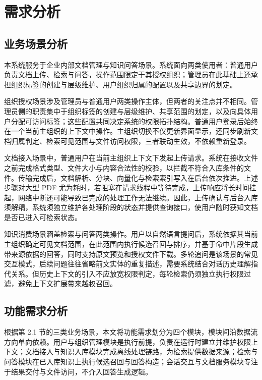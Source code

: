 \chapter{需求分析}
\label{cha:requirement}
\label{cha:requirements}

\section{业务场景分析}
\label{sec:business_scenario}

本系统服务于企业内部文档管理与知识问答场景。系统面向两类使用者：普通用户负责文档上传、检索与问答，操作范围限定于其授权组织；管理员在此基础上还承担组织标签的创建与层级维护、用户组织归属的配置以及共享边界的划定。

组织授权场景涉及管理员与普通用户两类操作主体，但两者的关注点并不相同。管理员侧的职责集中于组织标签的创建与层级维护、共享范围的划定，以及向具体用户分配可访问标签；这些配置共同决定系统的权限拓扑结构。普通用户登录后始终在一个当前主组织的上下文中操作。主组织切换不仅更新界面显示，还同步刷新文档归属判定、检索可见范围与文件访问权限，三者联动生效，不依赖重新登录。

文档接入场景中，普通用户在当前主组织上下文下发起上传请求。系统在接收文件之前完成格式类型、文件大小与内容合法性的校验，以拦截不符合入库条件的文件。传输完成后，文档解析、分块、向量化与检索索引写入在后台依次推进。上述步骤对大型 PDF 尤为耗时，若阻塞在请求线程中等待完成，上传响应将长时间挂起，网络中断还可能导致已完成的处理工作无法继续。因此，上传确认与后台入库须解耦，系统须独立维护各处理阶段的状态并提供查询接口，使用户随时获知文档是否已进入可检索状态。

知识消费场景涵盖检索与问答两类操作。用户以自然语言提问后，系统依据其当前主组织确定可见文档范围，在此范围内执行候选召回与排序，并基于命中片段生成带来源依据的回答，同时支持原文预览和授权文件下载。多轮追问是该场景的常见交互模式，后续问题往往省略前文实体的重复描述，需要系统结合对话历史理解指代关系。但历史上下文的引入不应放宽权限判定，每轮检索仍须独立执行权限过滤，避免上下文扩展带来越权召回。

\section{功能需求分析}
\label{sec:function_requirement}

根据第 2.1 节的三类业务场景，本文将功能需求划分为四个模块，模块间沿数据流方向单向依赖。用户与组织管理模块是执行前提，负责在运行时建立并维护权限上下文；文档接入与知识入库模块完成离线处理链路，为检索提供数据来源；检索与问答模块在已入库知识上执行候选召回与回答构造；会话交互与文档服务模块专注于结果交付与文件访问，不介入回答生成逻辑。

